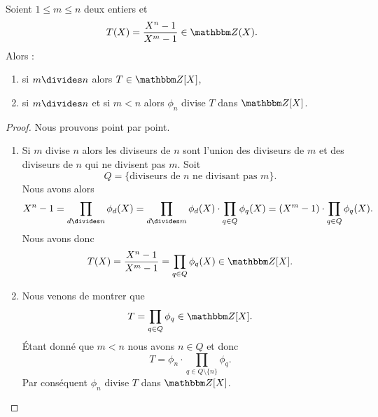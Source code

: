 \begin{proposition}     \label{PropUImYnL}
    Soient \( 1\leq m\leq n\) deux entiers et
    \begin{equation}
        T(X)=\frac{ X^n-1 }{ X^m-1 }\in \eZ(X).
    \end{equation}
    Alors :
    \begin{enumerate}
        \item   \label{ItemhpDPKE}
            si \( m\divides n\) alors \( T\in \eZ[X]\),
        \item
            si \( m\divides n\) et si \( m<n\) alors \( \phi_n\) divise \( T\) dans \( \eZ[X]\).
    \end{enumerate}
\end{proposition}

\begin{proof}
    Nous prouvons point par point.
    \begin{enumerate}
        \item
            Si \( m\) divise \( n\) alors les diviseurs de \( n\) sont l'union des diviseurs de \( m\) et des diviseurs de \( n\) qui ne divisent pas \( m\). Soit
            \begin{equation}
                Q=\{\text{diviseurs de } n\text{ ne divisant pas } m \}.
            \end{equation}
            Nous avons alors
            \begin{equation}
                X^n-1=\prod_{d\divides n}\phi_d(X)=\prod_{d\divides m}\phi_d(X)\cdot\prod_{q\in Q}\phi_q(X)=(X^m-1)\cdot\prod_{q\in Q}\phi_q(X).
            \end{equation}
            Nous avons donc
            \begin{equation}
                T(X)=\frac{ X^n-1 }{ X^m-1 }=\prod_{q\in Q}\phi_q(X)\in \eZ[X].
            \end{equation}

        \item

            Nous venons de montrer que
            \begin{equation}
                T=\prod_{q\in Q}\phi_q\in \eZ[X].
            \end{equation}
            Étant donné que \( m<n\) nous avons \( n\in Q\) et donc
            \begin{equation}
                T=\phi_n\cdot\prod_{q\in Q\setminus\{ n \}}\phi_q.
            \end{equation}
            Par conséquent \( \phi_n\) divise \( T\) dans \( \eZ[X]\).
        \end{enumerate}
\end{proof}

